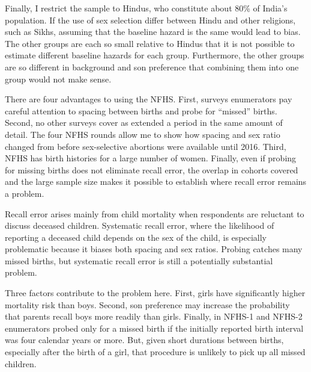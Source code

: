 \documentclass[12pt,letterpaper]{article}
\begin{document}
Finally, I restrict the sample to Hindus,
who constitute about 80\% of India's population.
If the use of sex selection differ between Hindu and other religions, such 
as Sikhs, assuming that the baseline hazard is the same would lead to bias.
The other groups are each so small relative to Hindus that it is not
possible to estimate different baseline hazards for each group.
Furthermore, the other groups are so different in background and son 
preference that combining them into one group would not make sense.

There are four advantages to using the NFHS.
First, surveys enumerators pay careful attention to spacing between births and
probe for ``missed'' births.
Second, no other surveys cover as extended a period in the same amount of detail.
The four NFHS rounds allow me to show how spacing and 
sex ratio changed from before sex-selective abortions were available until 2016.
Third, NFHS has birth histories for a large number of women.
Finally, even if probing for missing births does not eliminate recall error,   
the overlap in cohorts covered and the large sample size makes it possible 
to establish where recall error remains a problem.

Recall error arises mainly from child mortality when respondents are 
reluctant to discuss deceased children.
Systematic recall error, where the likelihood of reporting a deceased 
child depends on the sex of the child, is especially problematic because 
it biases both spacing and sex ratios.
Probing catches many missed births, but systematic recall error is 
still a potentially substantial problem.

Three factors contribute to the problem here.
First, girls have significantly higher mortality risk than boys.
Second, son preference may increase the probability that parents recall boys 
more readily than girls.
Finally, in NFHS-1 and NFHS-2 enumerators probed only for a missed birth if the
initially reported birth interval was four calendar years or more.
But, given short durations between births, especially after the birth of a girl,
that procedure is unlikely to pick up all missed children.
\end{document}
